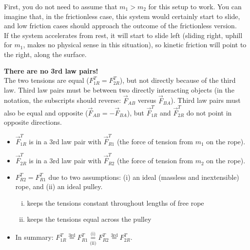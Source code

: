 \documentclass[]{article}
\begin{document}
\begin{TeacherMargin}
\noindent First, you do not need to assume that $m_{1} > m_{2}$ for this setup to work. You can imagine that, in the frictionless case, this system would certainly start to slide, and low friction cases should approach the outcome of the frictionless version. \\

\noindent If the system accelerates from rest, it will start to slide left (sliding right, uphill for $m_{1}$, makes no physical sense in this situation), so kinetic friction will point to the right, along the surface.
\begin{center}
\end{center}
\textbf{There are no 3rd law pairs!} \\
The two tensions are equal ($F^{T}_{1R} = F^{T}_{2R}$), but not directly because of the third law. Third law pairs must be between two directly interacting objects (in the notation, the subscripts should reverse: $\vec{F}_{AB}$ versus $\vec{F}_{BA}$). Third law pairs must also be equal and opposite ($\vec{F}_{AB}=-\vec{F}_{BA}$), but $\vec{F}^{T}_{1R}$ and $\vec{F}^{T}_{2R}$ do not point in opposite directions.
\begin{itemize}
	\item $\vec{F}^{T}_{1R}$ is in a 3rd law pair with $\vec{F}^{T}_{R1}$ (the force of tension from $m_{1}$ on the rope).
	\item $\vec{F}^{T}_{2R}$ is in a 3rd law pair with $\vec{F}^{T}_{R2}$ (the force of tension from $m_{2}$ on the rope).
	\item $F^{T}_{R2}=F^{T}_{R1}$ due to two assumptions: (i) an ideal (massless and inextensible) rope, and (ii) an ideal pulley.
	\begin{enumerate}[(i)]
		\item keeps the tensions constant throughout lengths of free rope
		\item keeps the tensions equal across the pulley
	\end{enumerate}
	\item In summary: $F^{T}_{1R} \overset{\text{3rd}}{=} F^{T}_{R1} \underset{\text{(ii)}}{\overset{\text{(i)}}{=}} F^{T}_{R2} \overset{\text{3rd}}{=} F^{T}_{2R}$.
\end{itemize}
\end{TeacherMargin}
\end{document}
